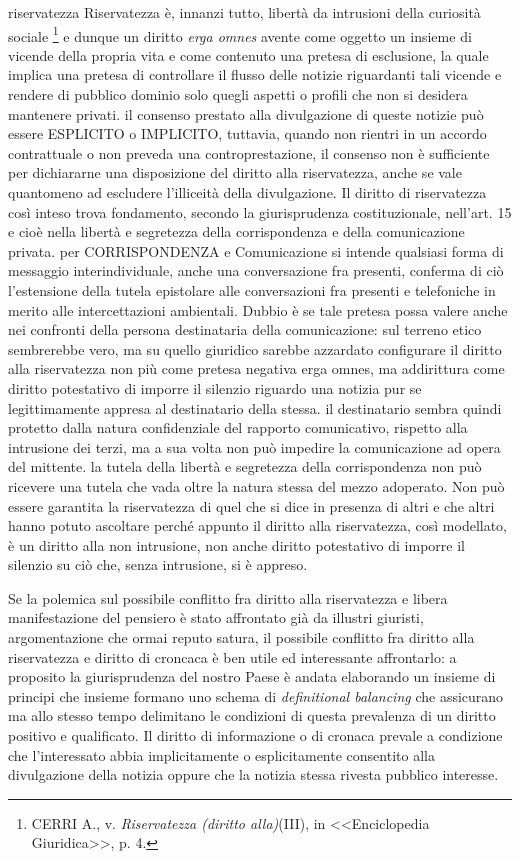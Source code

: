 {riservatezza}%
Riservatezza è, innanzi tutto, libertà da intrusioni della curiosità sociale \footnote{CERRI A., v. \textit{Riservatezza (diritto alla)}(III), in <<Enciclopedia Giuridica>>, p. 4.} e dunque un diritto \textit{erga omnes} avente come oggetto un insieme di vicende della propria vita e come contenuto una pretesa di esclusione, la quale implica una pretesa di controllare il flusso delle notizie riguardanti tali vicende e rendere di pubblico dominio solo quegli aspetti  o profili che non si desidera mantenere privati.
il consenso prestato alla divulgazione di queste notizie può essere ESPLICITO o IMPLICITO, tuttavia, quando non rientri in un accordo contrattuale o non preveda una controprestazione, il consenso non è sufficiente per dichiararne una disposizione del diritto alla riservatezza, anche se vale quantomeno ad escludere l'illiceità della divulgazione.
Il diritto di riservatezza così inteso trova fondamento, secondo la giurisprudenza costituzionale, nell'art. 15 e cioè  nella libertà e segretezza della corrispondenza e della comunicazione privata.
per CORRISPONDENZA e Comunicazione si intende qualsiasi forma di messaggio interindividuale, anche una conversazione fra presenti, conferma di ciò l'estensione della tutela epistolare alle conversazioni fra presenti e telefoniche in merito alle intercettazioni ambientali. Dubbio è se tale pretesa possa valere anche nei confronti della persona destinataria della comunicazione: sul terreno etico sembrerebbe vero, ma su quello giuridico sarebbe azzardato configurare il diritto alla riservatezza non più come pretesa negativa erga omnes, ma addirittura come diritto potestativo di imporre il silenzio riguardo una notizia pur se legittimamente appresa al destinatario della stessa. il destinatario sembra quindi protetto dalla natura confidenziale del rapporto comunicativo, rispetto alla intrusione dei terzi, ma a sua volta non può impedire la comunicazione ad opera del mittente. la tutela della libertà e segretezza della corrispondenza non può ricevere una tutela che vada oltre la natura stessa del mezzo adoperato.
Non può essere garantita la riservatezza di quel che si dice in presenza di altri e che altri hanno potuto ascoltare perché appunto il diritto alla riservatezza, così modellato, è un diritto alla non intrusione, non anche diritto potestativo di imporre il silenzio su ciò che, senza intrusione, si è appreso.

Se la polemica sul possibile conflitto fra diritto alla riservatezza e libera manifestazione del pensiero è stato affrontato già da illustri giuristi, argomentazione che ormai reputo satura, il possibile conflitto fra diritto alla riservatezza e diritto di croncaca è ben utile ed interessante affrontarlo:
a proposito la giurisprudenza del nostro Paese è andata elaborando un insieme di principi che insieme formano uno schema di \textit{definitional balancing} che assicurano ma allo stesso tempo delimitano le condizioni di questa prevalenza di un diritto positivo e qualificato.
Il diritto di informazione o di cronaca prevale a condizione che l'interessato abbia implicitamente o esplicitamente consentito alla divulgazione della notizia oppure che la notizia stessa rivesta pubblico interesse.


